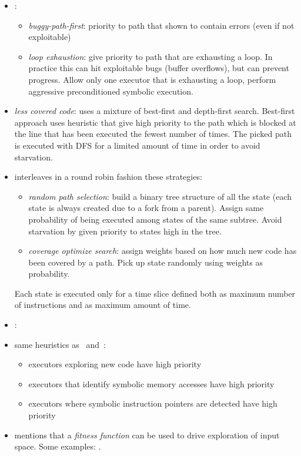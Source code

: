 \begin{itemize}

  \item \cite{AEG-NDSS11}:
  \begin{itemize}
    \item {\em buggy-path-first}: priority to path that shown to contain errors (even if not exploitable)
    \item {\em loop exhaustion}: give priority to path that are exhausting a loop. In practice this can hit exploitable bugs (buffer overflows), but can prevent progress. Allow only one executor that is exhausting a loop, perform aggressive preconditioned symbolic execution.
  \end{itemize}

  \item {\em less covered code}: \cite{EXE-CCS06} uses a mixture of best-first and depth-first search. Best-first approach uses heuristic that give high priority to the path which is blocked at the line that has been executed the fewest number of times. The picked path is executed with DFS for a limited amount of time in order to avoid starvation. 

  \item \cite{KLEE-OSDI08} interleaves in a round robin fashion these strategies:
  \begin{itemize}
    \item {\em random path selection}: build a binary tree structure of all the state (each state is always created due to a fork from a parent). Assign same probability of being executed among states of the same subtree. Avoid starvation by given priority to states high in the tree.
    \item {\em coverage optimize search}: assign weights based on how much new code has been covered by a path. Pick up state randomly using weights as probability.
  \end{itemize}
  Each state is executed only for a time slice defined both as maximum number of instructions and as maximum amount of time.

  \item \cite{SAGE-NDSS08}:

  \item \cite{MAYHEM-SP12} same heuristics as~\cite{SAGE-NDSS08} and~\cite{KLEE-OSDI08}:
  \begin{itemize}
    \item executors exploring new code have high priority
    \item executors that identify symbolic memory accesses have high priority
    \item executors where symbolic instruction pointers are detected have high priority
  \end{itemize}

  \item \cite{CS-CACM13} mentions that a {\em fitness function} can be used to drive exploration of input space. Some examples: \cite{BHH-ASE11,LMH-JSS10}.

\end{itemize}


